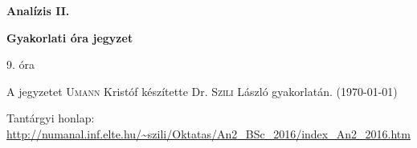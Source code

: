 \documentclass[a4paper,11.5pt]{article}
\begin{document}
	\setlength\parindent{0pt}
	\def\s{\hspace{0.2mm}\vphantom{\beta}}
	\def\Z{\mathbb{Z}}
	\def\Q{\mathbb{Q}}
	\def\R{\mathbb{R}}
	\def\C{\mathbb{C}}
	\def\N{\mathbb{N}}
	\def\Rn{\mathbb{R}^{n}}
	\def\Ra{\overline{\mathbb{R}}}
	\def\sume{\displaystyle\sum_{n=1}^{+\infty}}
	\def\sumn{\displaystyle\sum_{n=0}^{+\infty}}
	\def\biz{\emph{Bizonyítás:\ }}
	\def\narrow{\underset{n\rightarrow+\infty}{\longrightarrow}}
	\def\limn{\displaystyle\lim_{n\to +\infty}}
	\def\limx{\displaystyle\lim_{x\to +\infty}}
	
	\theoremstyle{definition}
	\newtheorem{theorem}{Tétel}[subsection] %
	
	\theoremstyle{definition}
	\newtheorem{definition}[theorem]{Definíció} %
	\newtheorem{example}[theorem]{Példa} %
	\newtheorem{task}[theorem]{Feladat} %
	\newtheorem{note}[theorem]{Megjegyzés} %
	\newtheorem{revision}[theorem]{Emlékeztető} %
	\begin{center}
		{\LARGE \textbf{Analízis II.}}
		
		{\large \textbf{Gyakorlati óra jegyzet}}
		
		9. óra
	\end{center}
	A jegyzetet \textsc{Umann} Kristóf készítette Dr. \textsc{Szili} László gyakorlatán. (\today)
	
	Tantárgyi honlap: \url{http://numanal.inf.elte.hu/~szili/Oktatas/An2_BSc_2016/index_An2_2016.htm}
\end{document}
